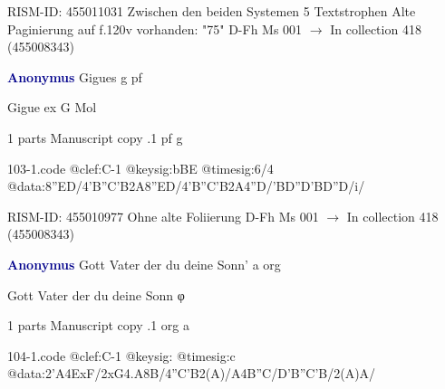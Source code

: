 \documentclass[twocolumn]{book}
\begin{document}
\newline RISM-ID: 455011031
\newline Zwischen den beiden Systemen 5 Textstrophen
\newline Alte Paginierung auf f.120v vorhanden: "75"
\newline D-Fh  Ms 001
\newline $\rightarrow$ In collection 418 (455008343)

\newline \par \vspace{7pt} \textcolor{darkblue}{\textbf{Anonymus  }}
\newline Gigues  g  
\newline pf
\newline \begin{itshape} Gigue ex G Mol\end{itshape} 
\newline \textcolor{darkblue}{}  1 parts  
\newline Manuscript copy
.1  pf  g  
\begin{filecontents*}{103-1.code}
@clef:C-1
@keysig:bBE
@timesig:6/4
@data:{8''ED}/4'B''C'B2A{8''ED}/4'B''C'B2A4''D/'BD''D'BD''D/i/
\end{filecontents*}
\newline
%

\newline RISM-ID: 455010977
\newline Ohne alte Foliierung
\newline D-Fh  Ms 001
\newline $\rightarrow$ In collection 418 (455008343)

\newline \par \vspace{7pt} \textcolor{darkblue}{\textbf{Anonymus  }}
\newline Gott Vater der du deine Sonn'  a  
\newline org
\newline \begin{itshape}[f.113v, heading:] Gott Vater der du deine Sonn φ\end{itshape} 
\newline \textcolor{darkblue}{}  1 parts  
\newline Manuscript copy
.1  org  a  
\begin{filecontents*}{104-1.code}
@clef:C-1
@keysig:
@timesig:c
@data:2'A4ExF/2xG4.A8B/4''C'B2(A)/A4B''C/D'B''C'B/2(A)A/
\end{filecontents*}
\newline
%
\end{document}
